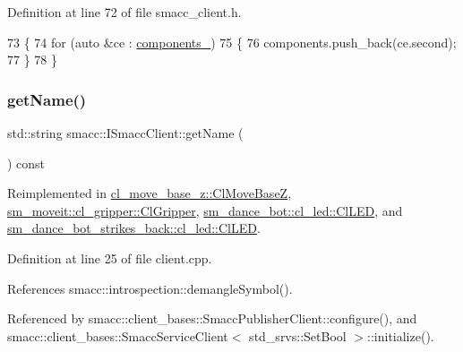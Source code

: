 Definition at line 72 of file smacc\+\_\+client.\+h.


\begin{DoxyCode}
73     \{
74         \textcolor{keywordflow}{for} (\textcolor{keyword}{auto} &ce : \hyperlink{classsmacc_1_1ISmaccClient_a9e670e9071bb549dbeb08985d0114afe}{components\_})
75         \{
76             components.push\_back(ce.second);
77         \}
78     \}
\end{DoxyCode}
\mbox{\label{classsmacc_1_1ISmaccClient_a8c3ce19f182e71909c5dc6263d25be69}} 
\subsubsection{\texorpdfstring{get\+Name()}{getName()}}
{\footnotesize\ttfamily std\+::string smacc\+::\+I\+Smacc\+Client\+::get\+Name (\begin{DoxyParamCaption}{ }\end{DoxyParamCaption}) const\hspace{0.3cm}{\ttfamily [virtual]}}



Reimplemented in \hyperlink{classcl__move__base__z_1_1ClMoveBaseZ_a3c511340ea5df8cbdb833c6c701c47f8}{cl\+\_\+move\+\_\+base\+\_\+z\+::\+Cl\+Move\+BaseZ}, \hyperlink{classsm__moveit_1_1cl__gripper_1_1ClGripper_a71ee172824d9eb24c9a386ea6d8822ea}{sm\+\_\+moveit\+::cl\+\_\+gripper\+::\+Cl\+Gripper}, \hyperlink{classsm__dance__bot_1_1cl__led_1_1ClLED_aa0a9fb92df96fb1bbba35c78fbe4119d}{sm\+\_\+dance\+\_\+bot\+::cl\+\_\+led\+::\+Cl\+L\+ED}, and \hyperlink{classsm__dance__bot__strikes__back_1_1cl__led_1_1ClLED_aa774d43fe5a936b4bf292cb5447becd9}{sm\+\_\+dance\+\_\+bot\+\_\+strikes\+\_\+back\+::cl\+\_\+led\+::\+Cl\+L\+ED}.



Definition at line 25 of file client.\+cpp.



References smacc\+::introspection\+::demangle\+Symbol().



Referenced by smacc\+::client\+\_\+bases\+::\+Smacc\+Publisher\+Client\+::configure(), and smacc\+::client\+\_\+bases\+::\+Smacc\+Service\+Client$<$ std\+\_\+srvs\+::\+Set\+Bool $>$\+::initialize().


